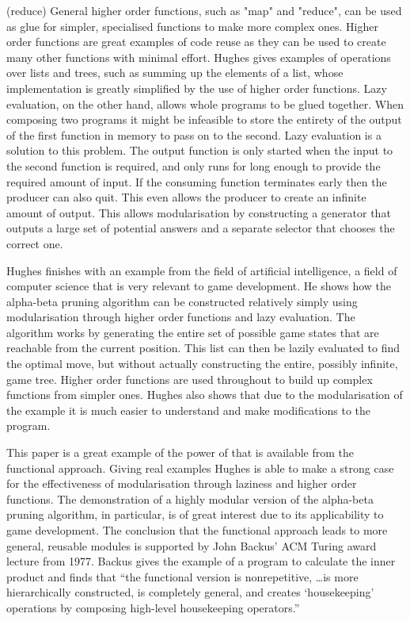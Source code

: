 \functions(reduce)
General higher order functions, such as "map" and "reduce", can be used as glue for
simpler, specialised functions to make more complex ones. Higher order functions
are great examples of code reuse as they can be used to create many other functions
with minimal effort. Hughes gives examples of operations over lists and trees, such
as summing up the elements of a list, whose implementation is greatly simplified
by the use of higher order functions. Lazy evaluation, on the other hand, allows
whole programs to be glued together. When composing two programs it might be
infeasible to store the entirety of the output of the first function in memory to
pass on to the second. Lazy evaluation is a solution to this problem. The output
function is only started when the input to the second function is required, and
only runs for long enough to provide the required amount of input. If the consuming
function terminates early then the producer can also quit. This even allows the
producer to create an infinite amount of output. This allows modularisation by
constructing a generator that outputs a large set of potential answers and a
separate selector that chooses the correct one.

Hughes finishes with an example from the field of artificial intelligence, a
field of computer science that is very relevant to game development. He shows
how the alpha-beta pruning algorithm can be constructed relatively simply using
modularisation through higher order functions and lazy evaluation. The algorithm
works by generating the entire set of possible game states that are reachable
from the current position. This list can then be lazily evaluated to find the
optimal move, but without actually constructing the entire, possibly infinite,
game tree. Higher order functions are used throughout to build up complex
functions from simpler ones. Hughes also shows that due to the modularisation
of the example it is much easier to understand and make modifications to the
program.

This paper is a great example of the power of that is available from the functional
approach. Giving real examples Hughes is able to make a strong case for the
effectiveness of modularisation through laziness and higher order functions.
The demonstration of a highly modular version of the alpha-beta pruning algorithm,
in particular, is of great interest due to its applicability to game development.
The conclusion that the functional approach leads to more general, reusable
modules is supported by John Backus' ACM Turing award lecture from 1977. Backus
gives the example of a program to calculate the inner product and finds that
``the functional version is nonrepetitive, \ldots is more hierarchically constructed,
is completely general, and creates `housekeeping' operations by composing high-level
housekeeping operators.''\cite{backus1978liberate}

